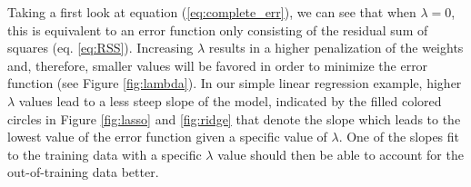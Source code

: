 \documentclass[11pt, a4paper]{article}
\begin{document}
Taking a first look at equation (\ref{eq:complete_err}), we can see that when $\lambda = 0$, this is equivalent to an error function only consisting of the residual sum of squares (eq. \ref{eq:RSS}). Increasing $\lambda$ results in a higher penalization of the weights and, therefore, smaller values will be favored in order to minimize the error function (see Figure \ref{fig:lambda}). In our simple linear regression example, higher $\lambda$ values lead to a less steep slope of the model, indicated by the filled colored circles in Figure \ref{fig:lasso} and \ref{fig:ridge} that denote the slope which leads to the lowest value of the error function given a specific value of $\lambda$. One of the slopes fit to the training data with a specific $\lambda$ value should then be able to account for the out-of-training data better.
\end{document}
